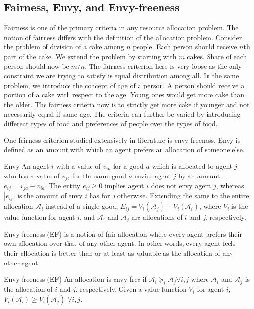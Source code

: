 \subsection{Fairness, Envy, and Envy-freeness}
\label{section_envy}
Fairness is one of the primary criteria in any resource allocation problem. The notion of fairness differs with the definition of the allocation problem. Consider the problem of division of a cake among $n$ people. Each person should receive $n$th part of the cake. We extend the problem by starting with $m$ cakes. Share of each person should now be $m/n$. The fairness criterion here is very loose as the only constraint we are trying to satisfy is equal distribution among all. In the same problem, we introduce the concept of age of a person. A person should receive a portion of a cake with respect to the age. Young ones would get more cake than the older. The fairness criteria now is to strictly get more cake if younger and not necessarily equal if same age. The criteria can further be varied by introducing different types of food and preferences of people over the types of food.

One fairness criterion studied extensively in literature is envy-freeness. Envy is defined as an amount with which an agent prefers an allocation of someone else. 

\begin{definition}{Envy}
\label{def_envy}
An agent $i$ with a value of $v_{ia}$ for a good $a$ which is allocated to agent $j$ who has a value of $v_{ja}$ for the same good $a$ envies agent $j$ by an
amount $e_{ij} = v_{ja} - v_{ia}$. The entity $e_{ij} \geq 0$ implies agent $i$ does not envy agent $j$, whereas $|e_{ij}|$ is the amount of envy $i$ has for $j$ otherwise. Extending the same to the entire allocation $\mathcal{A}_i$ instead of a single good, $E_{ij} = V_i(\mathcal{A}_j) - V_i(\mathcal{A}_i)$, where $V_i$ is the value function for agent $i$, and $\mathcal{A}_i$ and $\mathcal{A}_j$ are allocations of $i$ and $j$, respectively.
\end{definition}

Envy-freeness (EF) is a notion of fair allocation where every agent prefers their own allocation over that of any other agent. In other words, every agent feels their allocation is better than or at least as valuable as the allocation of any other agent.


\begin{definition}{Envy-freeness (EF)}
\label{def_envyfree}
An allocation is envy-free if $\mathcal{A}_i \succeq_i \mathcal{A}_j \forall i,j$ where $\mathcal{A}_i$ and $\mathcal{A}_j$ is the allocation of $i$ and $j$, respectively. Given a value function $V_i$ for agent $i$, $V_i(\mathcal{A}_i) \geq V_i(\mathcal{A}_j)$ $\forall i,j$. 
\end{definition}

